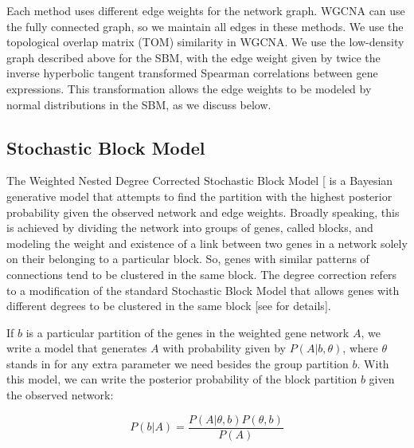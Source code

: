 \documentclass[
]{article}
\begin{document}
Each method uses different edge weights for the network graph. WGCNA can
use the fully connected graph, so we maintain all edges in these
methods. We use the topological overlap matrix (TOM) similarity in
WGCNA. We use the low-density graph described above for the SBM, with
the edge weight given by twice the inverse hyperbolic tangent
transformed Spearman correlations between gene expressions. This
transformation allows the edge weights to be modeled by normal
distributions in the SBM, as we discuss below.

\subsection{Stochastic Block Model}\label{stochastic-block-model}

The Weighted Nested Degree Corrected Stochastic Block Model
{[}\citeproc{ref-Karrer2011-vp}{24}{]} is a Bayesian generative model
that attempts to find the partition with the highest posterior
probability given the observed network and edge weights. Broadly
speaking, this is achieved by dividing the network into groups of genes,
called blocks, and modeling the weight and existence of a link between
two genes in a network solely on their belonging to a particular block.
So, genes with similar patterns of connections tend to be clustered in
the same block. The degree correction refers to a modification of the
standard Stochastic Block Model that allows genes with different degrees
to be clustered in the same block {[}see
 for details{]}.

If \(b\) is a particular partition of the genes in the weighted gene
network \(A\), we write a model that generates \(A\) with probability
given by \(P(A| b, \theta)\), where \(\theta\) stands in for any extra
parameter we need besides the group partition \(b\). With this model, we
can write the posterior probability of the block partition \(b\) given
the observed network:

\[
P(b|A) = \frac{P(A|\theta, b)P(\theta, b)}{P(A)}
\]
\end{document}
